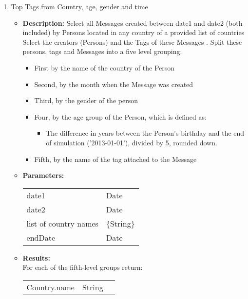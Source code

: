 {\begin{enumerate}
      \item Top Tags from Country, age, gender and time 
            \begin{itemize}
                \item \textbf{Description:}
                  Select all Messages created between date1 and date2 (both included) by Persons located in any country
                  of a provided list of countries Select the creators (Persons) and the Tags of these Messages .  Split
                  these persons, tags and Messages into a five level grouping:
                  \begin{itemize}
                    \item First by the name of the country of the Person
                    \item  Second, by the month when the Message was created
                    \item Third, by the gender of the person
                    \item      Four, by the age group of the Person, which is defined as:
                      \begin{itemize}
                        \item The difference in years between the Person's birthday and the end of
                          simulation ('2013-01-01'), divided by 5, rounded down.
                      \end{itemize}
                    \item  Fifth, by the name of the tag attached to the Message
                  \end{itemize}
                \item \textbf{Parameters:} \\
                    \begin{tabular}{ll}
                      date1 & Date \\
                      date2 & Date \\
                      list of country names & \{String\} \\
                      endDate & Date \\
                    \end{tabular}
                \item \textbf{Results:} \\
                  For each of the fifth-level groups return: 
                    \begin{tabular}{lll}
                      Country.name & String & \\

\end{tabular}
\end{itemize}
\end{enumerate}}
